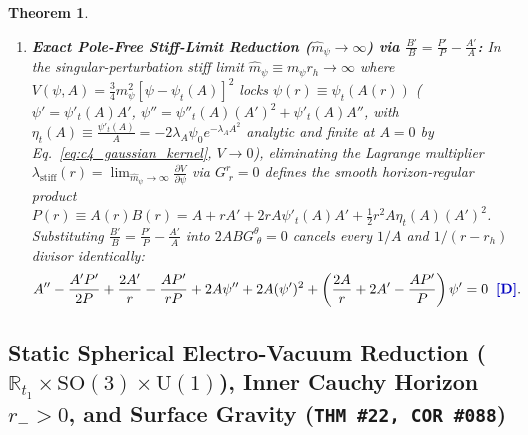 \documentclass[11pt,a4paper]{article}
\newcommand{\catD}{\text{\textbf{\textcolor{blue!75!black}{[D]}}}}
\theoremstyle{definition}
\theoremstyle{plain}
\newtheorem{theorem}[axiom]{Theorem}
\theoremstyle{remark}
\begin{document}
\begin{theorem}
\begin{enumerate}[label=(\alph*)]
  \begin{align}
  b_{-1} &= \frac{r_h(r_h\psi'_h + 2)}{2(1 - r_h^2 V_h)}, \qquad
  \psi'(r_h) = \frac{2\,r_h\left(V_h - (\partial_\psi V)_h\right)}{r_h^2\left(2\,V_h + (\partial_\psi V)_h\right) - 3} \;\;\catD, \nonumber \\[4pt]
  \mathcal{C}_{B^2}\!\left(\psi_h, \psi'(r_h)\right) + \frac{1}{b_{-1}} &= -\frac{2(1 - r_h^2 V_h)}{r_h(r_h\psi'(r_h) + 2)} + \frac{2(1 - r_h^2 V_h)}{r_h(r_h\psi'(r_h) + 2)} \equiv 0 \;\;\catD. \label{eq:c5_frobenius_pole_cancellation}
  \end{align}
  \item \textbf{Exact Pole-Free Stiff-Limit Reduction ($\hat{m}_\psi \to \infty$) via $\frac{B'}{B} = \frac{P'}{P} - \frac{A'}{A}$:}
  In the singular-perturbation stiff limit $\hat{m}_\psi \equiv m_\psi r_h \to \infty$ where $V(\psi, A) = \frac{3}{4}m_\psi^2[\psi - \psi_t(A)]^2$ locks $\psi(r) \equiv \psi_t(A(r))$ ($\psi' = \psi'_t(A)A'$, $\psi'' = \psi''_t(A)(A')^2 + \psi'_t(A)A''$, with $\eta_t(A) \equiv \frac{\psi'_t(A)}{A} = -2\lambda_A\psi_0 e^{-\lambda_A A^2}$ analytic and finite at $A = 0$ by Eq.~\eqref{eq:c4_gaussian_kernel}, $V \to 0$), eliminating the Lagrange multiplier $\lambda_{\mathrm{stiff}}(r) = \lim_{\hat{m}_\psi\to\infty}\frac{\partial V}{\partial\psi}$ via $G^r_{\;r} = 0$ defines the smooth horizon-regular product $P(r) \equiv A(r)B(r) = A + rA' + 2rA\psi'_t(A)A' + \frac{1}{2}r^2 A\eta_t(A)(A')^2$. Substituting $\frac{B'}{B} = \frac{P'}{P} - \frac{A'}{A}$ into $2ABG^\theta_{\;\theta} = 0$ cancels every $1/A$ and $1/(r - r_h)$ divisor identically:
  \begin{equation}\label{eq:c5_stiff_limit_ode}
  A'' - \frac{A'P'}{2P} + \frac{2A'}{r} - \frac{AP'}{rP} + 2A\psi'' + 2A(\psi')^2 + \left(\frac{2A}{r} + 2A' - \frac{AP'}{P}\right)\psi' = 0 \;\;\catD.
  \end{equation}
\end{enumerate}
\end{theorem}

\subsection{Static Spherical Electro-Vacuum Reduction ($\mathbb{R}_{t_1} \times \mathrm{SO}(3) \times \mathrm{U}(1)$), Inner Cauchy Horizon $r_- > 0$, and Surface Gravity (\texttt{THM~\#22, COR~\#088})}
\end{document}
